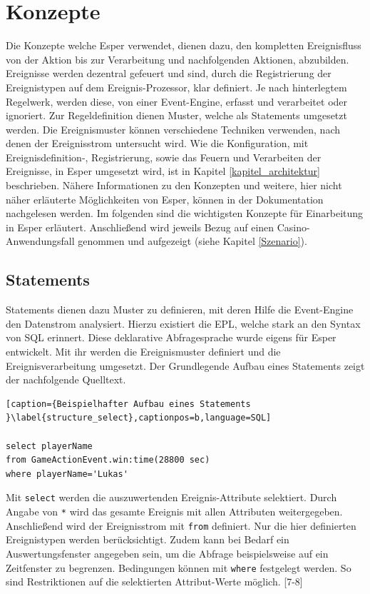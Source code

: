 \chapter{Konzepte}
Die Konzepte welche Esper verwendet, dienen dazu, den kompletten Ereignisfluss von der Aktion bis zur Verarbeitung und nachfolgenden Aktionen, abzubilden.
Ereignisse werden dezentral gefeuert und sind, durch die Registrierung der Ereignistypen auf dem Ereignis-Prozessor, klar definiert. Je nach hinterlegtem Regelwerk, werden diese, von einer Event-Engine, erfasst und verarbeitet oder ignoriert. Zur Regeldefinition dienen Muster, welche als Statements umgesetzt werden. Die Ereignismuster können verschiedene Techniken verwenden, nach denen der Ereignisstrom untersucht wird. 
Wie die Konfiguration, mit Ereignisdefinition-, Registrierung, sowie das Feuern und Verarbeiten der Ereignisse, in Esper umgesetzt wird, ist in Kapitel \ref{kapitel_architektur} beschrieben.
Nähere Informationen zu den Konzepten und weitere, hier nicht näher erläuterte Möglichkeiten von Esper, können in der Dokumentation \cite{EsperRef2018} nachgelesen werden.
Im folgenden sind die wichtigsten Konzepte für Einarbeitung in Esper erläutert. Anschließend wird jeweils Bezug auf einen Casino-Anwendungsfall genommen und aufgezeigt (siehe Kapitel \ref{Szenario}).


\section{Statements}
\label{statements}
Statements dienen dazu Muster zu definieren, mit deren Hilfe die Event-Engine den Datenstrom analysiert. Hierzu existiert die \acf{EPL}, welche stark an den Syntax von SQL erinnert. Diese deklarative Abfragesprache wurde eigens für Esper entwickelt. Mit ihr werden die Ereignismuster definiert und die Ereignisverarbeitung umgesetzt. Der Grundlegende Aufbau eines Statements zeigt der nachfolgende Quelltext.
\begin{lstlisting}[caption={Beispielhafter Aufbau eines Statements }\label{structure_select},captionpos=b,language=SQL]

select playerName 
from GameActionEvent.win:time(28800 sec)
where playerName='Lukas'

\end{lstlisting}
Mit \texttt{select} werden die auszuwertenden Ereignis-Attribute selektiert. Durch Angabe von \texttt{*} wird das gesamte Ereignis mit allen Attributen weitergegeben.
Anschließend wird der Ereignisstrom mit \texttt{from} definiert.
Nur die hier definierten Ereignistypen werden berücksichtigt. Zudem kann bei Bedarf ein Auswertungsfenster angegeben sein, um die Abfrage beispielsweise auf ein Zeitfenster zu begrenzen.
Bedingungen können mit \texttt{where} festgelegt werden. So sind Restriktionen auf die selektierten Attribut-Werte möglich.
\cite{EsperRef2018}[7-8]

